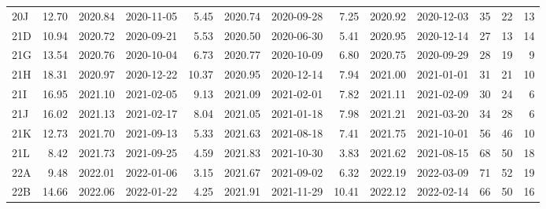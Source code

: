 \begin{tabular}{lrrlrrlrrlrrr}
  20J &     12.70 &     2020.84 &      2020-11-05 &     5.45 &    2020.74 &     2020-09-28 &      7.25 &     2020.92 &      2020-12-03 &       35 &      22 &       13 \\
  21D &     10.94 &     2020.72 &      2020-09-21 &     5.53 &    2020.50 &     2020-06-30 &      5.41 &     2020.95 &      2020-12-14 &       27 &      13 &       14 \\
  21G &     13.54 &     2020.76 &      2020-10-04 &     6.73 &    2020.77 &     2020-10-09 &      6.80 &     2020.75 &      2020-09-29 &       28 &      19 &        9 \\
  21H &     18.31 &     2020.97 &      2020-12-22 &    10.37 &    2020.95 &     2020-12-14 &      7.94 &     2021.00 &      2021-01-01 &       31 &      21 &       10 \\
  21I &     16.95 &     2021.10 &      2021-02-05 &     9.13 &    2021.09 &     2021-02-01 &      7.82 &     2021.11 &      2021-02-09 &       30 &      24 &        6 \\
  21J &     16.02 &     2021.13 &      2021-02-17 &     8.04 &    2021.05 &     2021-01-18 &      7.98 &     2021.21 &      2021-03-20 &       34 &      28 &        6 \\
  21K &     12.73 &     2021.70 &      2021-09-13 &     5.33 &    2021.63 &     2021-08-18 &      7.41 &     2021.75 &      2021-10-01 &       56 &      46 &       10 \\
  21L &      8.42 &     2021.73 &      2021-09-25 &     4.59 &    2021.83 &     2021-10-30 &      3.83 &     2021.62 &      2021-08-15 &       68 &      50 &       18 \\
  22A &      9.48 &     2022.01 &      2022-01-06 &     3.15 &    2021.67 &     2021-09-02 &      6.32 &     2022.19 &      2022-03-09 &       71 &      52 &       19 \\
  22B &     14.66 &     2022.06 &      2022-01-22 &     4.25 &    2021.91 &     2021-11-29 &     10.41 &     2022.12 &      2022-02-14 &       66 &      50 &       16 \\
\bottomrule
\end{tabular}
